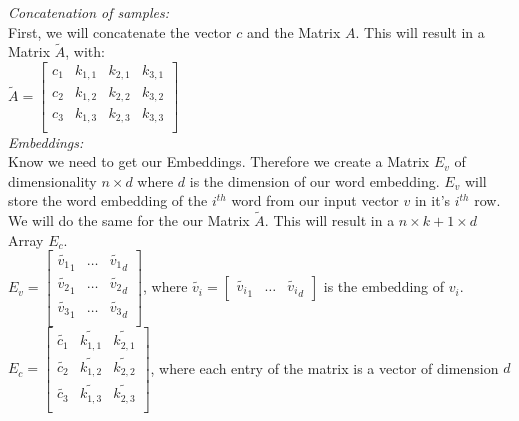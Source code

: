 \textit{Concatenation of samples:}\\
First, we will concatenate the vector $c$ and the Matrix $A$. This will result in a Matrix $\tilde{A}$, with:\\
$\tilde{A} = \begin{bmatrix}
c_1 & k_{1,1} & k_{2,1} & k_{3,1}\\
c_2 & k_{1,2} & k_{2,2} & k_{3,2}\\
c_3 & k_{1,3} & k_{2,3}& k_{3,3}\\
\end{bmatrix}$\\

\textit{Embeddings:}\\
 Know we need to get our Embeddings. Therefore we create a Matrix $E_v$ of dimensionality $n \times d$ where $d$ is the dimension of our word embedding. $E_v$ will store the word embedding of the $i^{th}$ word from our input vector $v$ in it's $i^{th}$ row. We will do the same for the our Matrix $\tilde{A}$. This will result in a $n \times k+1 \times d$ Array $E_c$. \\
 $E_v = \begin{bmatrix}
\tilde{v_1}_1 & \ldots & \tilde{v_1}_d\\
\tilde{v_2}_1 & \ldots & \tilde{v_2}_d\\
\tilde{v_3}_1 & \ldots & \tilde{v_3}_d\\
\end{bmatrix}
$, where $\tilde{v_i} = \begin{bmatrix}
\tilde{v_i}_1 & \ldots & \tilde{v_i}_d \end{bmatrix}$ is the embedding of $v_i$.  \\

$E_c = \begin{bmatrix}
\tilde{c_1 }& \tilde{k_{1,1}} & \tilde{k_{2,1}} \\
\tilde{c_2 }& \tilde{k_{1,2}}& \tilde{k_{2,2}} \\
\tilde{c_3 }&\tilde{ k_{1,3} }& \tilde{k_{2,3}}\\
\end{bmatrix}$,
where each entry of the matrix is a vector of dimension $d$\\

